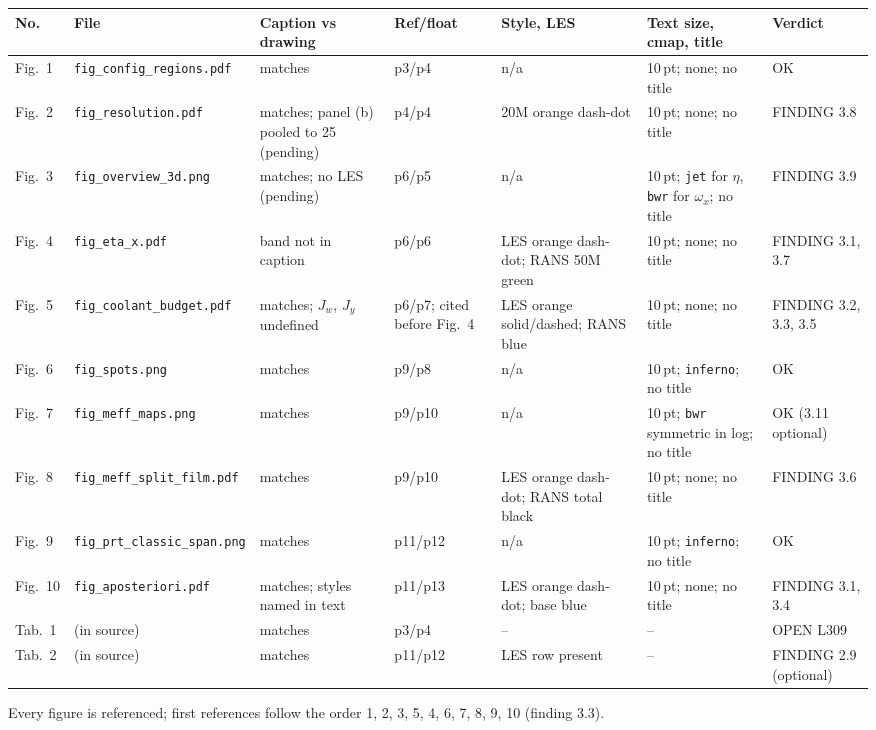 \documentclass[10pt]{article}
\begin{document}
{\small
\begin{longtable}{@{}l >{\raggedright\arraybackslash\scriptsize}p{3.2cm} L{2.3cm} L{1.7cm} L{2.3cm} L{2.6cm} L{2.0cm}@{}}
\toprule
No. & File & Caption vs drawing & Ref/float & Style, LES & Text size, cmap, title & Verdict \\
\midrule
\endhead
Fig.~1 & \texttt{fig\_config\_regions.pdf} & matches & p3/p4 & n/a & 10\,pt; none; no title & OK \\
Fig.~2 & \texttt{fig\_resolution.pdf} & matches; panel (b) pooled to 25 (pending) & p4/p4 & 20M orange dash-dot &
10\,pt; none; no title & FINDING 3.8 \\
Fig.~3 & \texttt{fig\_overview\_3d.png} & matches; no LES (pending) & p6/p5 & n/a & 10\,pt; \texttt{jet} for
$\eta$, \texttt{bwr} for $\omega_x$; no title & FINDING 3.9 \\
Fig.~4 & \texttt{fig\_eta\_x.pdf} & band not in caption & p6/p6 & LES orange dash-dot; RANS 50M green & 10\,pt;
none; no title & FINDING 3.1, 3.7 \\
Fig.~5 & \texttt{fig\_coolant\_budget.pdf} & matches; $J_w$, $J_y$ undefined & p6/p7; cited before Fig.~4 & LES
orange solid/dashed; RANS blue & 10\,pt; none; no title & FINDING 3.2, 3.3, 3.5 \\
Fig.~6 & \texttt{fig\_spots.png} & matches & p9/p8 & n/a & 10\,pt; \texttt{inferno}; no title & OK \\
Fig.~7 & \texttt{fig\_meff\_maps.png} & matches & p9/p10 & n/a & 10\,pt; \texttt{bwr} symmetric in log; no title &
OK (3.11 optional) \\
Fig.~8 & \texttt{fig\_meff\_split\_film.pdf} & matches & p9/p10 & LES orange dash-dot; RANS total black & 10\,pt;
none; no title & FINDING 3.6 \\
Fig.~9 & \texttt{fig\_prt\_classic\_span.png} & matches & p11/p12 & n/a & 10\,pt; \texttt{inferno}; no title & OK
\\
Fig.~10 & \texttt{fig\_aposteriori.pdf} & matches; styles named in text & p11/p13 & LES orange dash-dot; base
blue & 10\,pt; none; no title & FINDING 3.1, 3.4 \\
Tab.~1 & (in source) & matches & p3/p4 & -- & -- & OPEN L309 \\
Tab.~2 & (in source) & matches & p11/p12 & LES row present & -- & FINDING 2.9 (optional) \\
\bottomrule
\end{longtable}}

Every figure is referenced; first references follow the order 1, 2, 3, 5, 4, 6, 7, 8, 9, 10 (finding 3.3).
\end{document}
